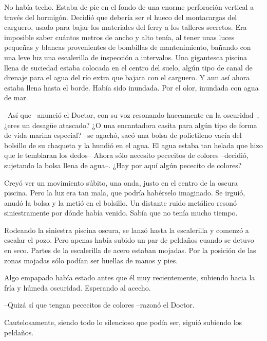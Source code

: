 {No había techo. Estaba de pie en el fondo de una enorme perforación
 vertical a través del hormigón. Decidió que debería ser el hueco del
 montacargas del carguero, usado para bajar los materiales del ferry a
 los talleres secretos. Era imposible saber cuántos metros de ancho y
 alto tenía, al tener unas luces pequeñas y blancas provenientes de
 bombillas de mantenimiento, bañando con una leve luz una escalerilla de
 inspección a intervalos. Una gigantesca piscina llena de suciedad estaba
 colocada en el centro del suelo, algún tipo de canal de drenaje para el
 agua del río extra que bajara con el carguero. Y aun así ahora estaba
 llena hasta el borde. Había sido inundada. Por el olor, inundada con
agua de mar.}

{--Así que --anunció el Doctor, con su voz resonando huecamente en la
 oscuridad--, ¿eres un desagüe atascado? ¿O una encantadora casita para
 algún tipo de forma de vida marina especial? --se agachó, sacó una bolsa
 de polietileno vacía del bolsillo de su chaqueta y la hundió en el agua.
 El agua estaba tan helada que hizo que le temblaran los dedos-- Ahora
 sólo necesito pececitos de colores --decidió, sujetando la bolsa llena
de agua--. ¿Hay por aquí algún pececito de colores?}

{Creyó ver un movimiento súbito, una onda, justo en el centro de la
 oscura piscina. Pero la luz era tan mala, que podría habérselo
 imaginado. Se irguió, anudó la bolsa y la metió en el bolsillo. Un
 distante ruido metálico resonó siniestramente por dónde había venido.
Sabía que no tenía mucho tiempo.}

{Rodeando la siniestra piscina oscura, se lanzó hasta la escalerilla y
 comenzó a escalar el pozo. Pero apenas había subido un par de peldaños
 cuando se detuvo en seco. Partes de la escalerilla de acero estaban
 mojadas. Por la posición de las zonas mojadas sólo podían ser huellas de
manos y pies.}

{Algo empapado había estado antes que él muy recientemente, subiendo
hacia la fría y húmeda oscuridad. Esperando al acecho.}

{--Quizá sí que tengan pececitos de colores --razonó el Doctor.}

{Cautelosamente, siendo todo lo silencioso que podía ser, siguió
subiendo los peldaños.}
